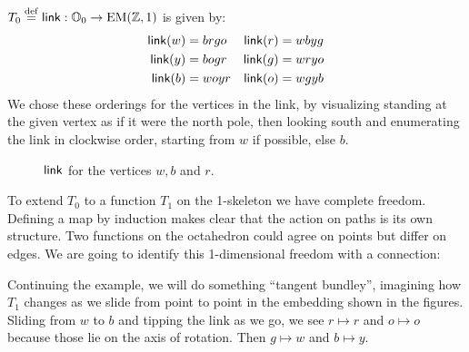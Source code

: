 \begin{mydef}
\( T_0\stackrel{\mathrm{def}}{=}\operatorname{\mathsf{link}}:\mathbb{O}_0\to\mathrm{EM}(\mathbb{Z},1) \) is given by:
\begin{align*}
\operatorname{\mathsf{link}}(w) &= brgo & \operatorname{\mathsf{link}}(r) &= wbyg \\
\operatorname{\mathsf{link}}(y) &= bogr & \operatorname{\mathsf{link}}(g) &= wryo \\
\operatorname{\mathsf{link}}(b) &= woyr & \operatorname{\mathsf{link}}(o) &= wgyb
\end{align*}
We chose these orderings for the vertices in the link, by visualizing standing at the given vertex as if it were the north pole, then looking south and enumerating the link in clockwise order, starting from \( w \) if possible, else \( b \).
\end{mydef}

\begin{figure}[htbp]
\centering

\caption{\( \operatorname{\mathsf{link}} \) for the vertices \( w, b\) and \( r \).}
\label{fig:triangle_of_equators}
\end{figure}

To extend \( T_0 \) to a function \( T_1 \) on the 1-skeleton we have complete freedom. Defining a map by induction makes clear that the action on paths is its own structure. Two functions on the octahedron could agree on points but differ on edges. We are going to identify this 1-dimensional freedom with a connection:

Continuing the example, we will do something ``tangent bundley'', imagining how \( T_1 \) changes as we slide from point to point in the embedding shown in the figures. Sliding from \( w \) to \( b \) and tipping the link as we go, we see \( r\mapsto r \) and \( o\mapsto o \) because those lie on the axis of rotation. Then \( g\mapsto w \) and \( b\mapsto y \). 

